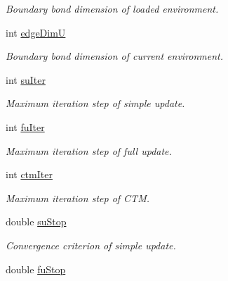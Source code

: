 \begin{DoxyCompactItemize}
\begin{DoxyCompactList}\small\item\em Boundary bond dimension of loaded environment. \end{DoxyCompactList}\item 
int \hyperlink{structparaIpeps_a7b04b6de0802d22bc0f2930ad89dd1ac}{edge\+DimU}\hypertarget{structparaIpeps_a7b04b6de0802d22bc0f2930ad89dd1ac}{}\label{structparaIpeps_a7b04b6de0802d22bc0f2930ad89dd1ac}

\begin{DoxyCompactList}\small\item\em Boundary bond dimension of current environment. \end{DoxyCompactList}\item 
int \hyperlink{structparaIpeps_a40772e9b9db50eb76de898a0b12f4eb0}{su\+Iter}\hypertarget{structparaIpeps_a40772e9b9db50eb76de898a0b12f4eb0}{}\label{structparaIpeps_a40772e9b9db50eb76de898a0b12f4eb0}

\begin{DoxyCompactList}\small\item\em Maximum iteration step of simple update. \end{DoxyCompactList}\item 
int \hyperlink{structparaIpeps_a42a8a382f70e94abf651b585029fba09}{fu\+Iter}\hypertarget{structparaIpeps_a42a8a382f70e94abf651b585029fba09}{}\label{structparaIpeps_a42a8a382f70e94abf651b585029fba09}

\begin{DoxyCompactList}\small\item\em Maximum iteration step of full update. \end{DoxyCompactList}\item 
int \hyperlink{structparaIpeps_acea06fcd6dffc7c067313fada42df6be}{ctm\+Iter}\hypertarget{structparaIpeps_acea06fcd6dffc7c067313fada42df6be}{}\label{structparaIpeps_acea06fcd6dffc7c067313fada42df6be}

\begin{DoxyCompactList}\small\item\em Maximum iteration step of C\+TM. \end{DoxyCompactList}\item 
double \hyperlink{structparaIpeps_a59faee0d27f815da16ae01f36b2b7475}{su\+Stop}\hypertarget{structparaIpeps_a59faee0d27f815da16ae01f36b2b7475}{}\label{structparaIpeps_a59faee0d27f815da16ae01f36b2b7475}

\begin{DoxyCompactList}\small\item\em Convergence criterion of simple update. \end{DoxyCompactList}\item 
double \hyperlink{structparaIpeps_aca3404775c47ae77cf5d55954202ed14}{fu\+Stop}\hypertarget{structparaIpeps_aca3404775c47ae77cf5d55954202ed14}{}\label{structparaIpeps_aca3404775c47ae77cf5d55954202ed14}


\end{DoxyCompactItemize}
